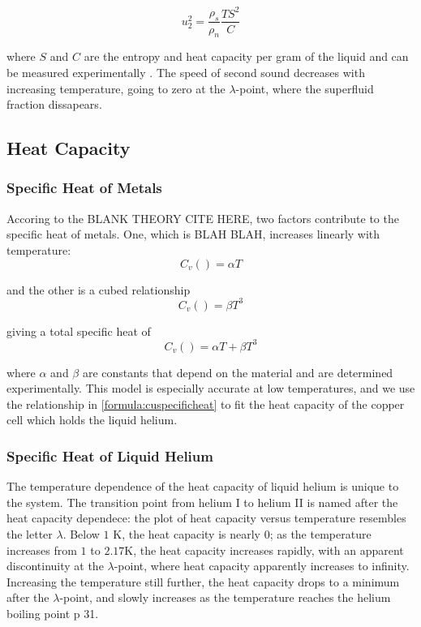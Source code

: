 \begin{equation}
u_2^2 = \frac{\rho_s}{\rho_n}\frac{T S^2}{C}
\end{equation}

where $S$ and $C$ are the entropy and heat capacity per gram of the
liquid and can be measured experimentally \cite{atkins}. The
speed of second sound decreases with increasing temperature, going
to zero at the $\lambda$-point, where the superfluid fraction
dissapears.

\subsection{Heat Capacity}

\subsubsection{Specific Heat of Metals}\label{specificheatofmetals}

Accoring to the BLANK THEORY CITE HERE, two factors contribute to the
specific heat of metals. One, which is BLAH BLAH, increases linearly with temperature:
\begin{equation}
C_v() = \alpha T
\end{equation}

and the other is a cubed relationship
\begin{equation}
C_v() = \beta T^3
\end{equation}

giving a total specific heat of
\begin{equation}\label{formula:cuspecificheat}
C_v() =  \alpha T + \beta T^3
\end{equation}

where $\alpha$ and $\beta$ are constants that depend on the material
and are determined experimentally. This model is especially accurate
at low temperatures, and we use the relationship in
\ref{formula:cuspecificheat} to fit the heat capacity of the copper
cell which holds the liquid helium.

\subsubsection{Specific Heat of Liquid Helium}

The temperature dependence of the heat capacity of liquid helium is
unique to the system. The transition point from helium I to helium II
is named after the heat capacity dependece: the plot of heat capacity
versus temperature resembles the letter $\lambda$. Below $1$ K, the
heat capacity is nearly $0$; as the temperature increases from $1$ to
$2.17$K, the heat capacity increases rapidly, with an apparent
discontinuity at the $\lambda$-point, where heat capacity apparently
increases to infinity. Increasing the temperature still further, the
heat capacity drops to a minimum after the $\lambda$-point, and slowly
increases as the temperature reaches the helium boiling point p
31\cite{atkins}.


